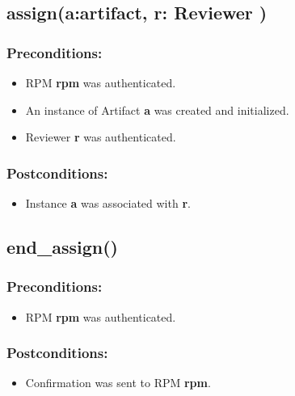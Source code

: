 \subsection*{assign(a:artifact, r: Reviewer )}

\subsubsection*{Preconditions:}
\begin{itemize}
\itemsep-1.5em 
    \item RPM \textbf{rpm} was authenticated.
    \item An instance of Artifact \textbf{a} was created and initialized.
    \item Reviewer \textbf{r} was authenticated.
  
   
\end{itemize}



\subsubsection*{Postconditions:}
\begin{itemize}
\itemsep-1.5em 
   \item Instance \textbf{a} was associated with \textbf{r}.

\end{itemize}





\subsection*{end\_assign()}

\subsubsection*{Preconditions:}
\begin{itemize}
\itemsep-1.5em 
    \item RPM \textbf{ rpm} was authenticated.
    
  
   
\end{itemize}



\subsubsection*{Postconditions:}
\begin{itemize}
\itemsep-1.5em 
   \item Confirmation was sent to RPM \textbf{rpm}. 

\end{itemize}









